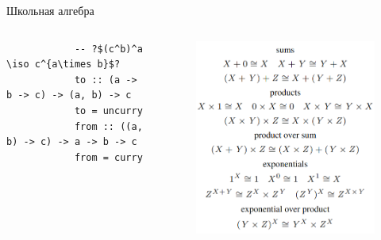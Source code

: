     \begin{frame}[fragile]{Школьная алгебра}
        \vspace{-1em}
        \begin{columns}[onlytextwidth]
            \begin{column}{0.485\textwidth}
                \begin{verbatim}
            -- ?$(c^b)^a \iso c^{a\times b}$?
            to :: (a -> b -> c) -> (a, b) -> c
            to = uncurry
            from :: ((a, b) -> c) -> a -> b -> c
            from = curry
                \end{verbatim}
            \end{column}\hfill%
            \begin{column}[t]{0.485\textwidth}
                \pause\vspace{-1em}
                \begin{figure}[h]
                    \centering
                    \includegraphics[width=1\textwidth]{figs/school-alg}
                \end{figure}
            \end{column}
        \end{columns}
    \end{frame}

